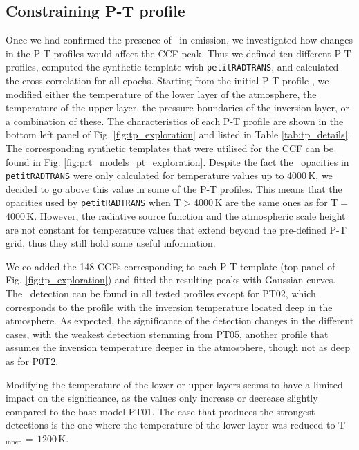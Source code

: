 \documentclass{aa}
\newcommand{\feI}{\ion{Fe}{i}}
\begin{document}
\subsection{Constraining P-T profile}
\label{sect:pt_exploration}


Once we had confirmed the presence of \feI\ in emission, we investigated how changes in the P-T profiles would affect the CCF peak. Thus we defined ten different P-T profiles, computed the synthetic template with \texttt{petitRADTRANS}, and calculated the cross-correlation for all epochs. Starting from the initial P-T profile \citep[PT01, see Fig. \ref{fig:prt_models} and Sect. \ref{synthetic_models},][]{wardenier2021, wardenier2023}, we modified either the temperature of the lower layer of the atmosphere, the temperature of the upper layer, the pressure boundaries of the inversion layer, or a combination of these. The characteristics of each P-T profile are shown in the bottom left panel of Fig. \ref{fig:tp_exploration} and listed in Table \ref{tab:tp_details}. The corresponding synthetic templates that were utilised for the CCF can be found in Fig. \ref{fig:prt_models_pt_exploration}. Despite the fact the \feI\ opacities in \texttt{petitRADTRANS} were only calculated for temperature values up to 4000\,K, we decided to go above this value in some of the P-T profiles. This means that the opacities used by \texttt{petitRADTRANS} when T$>$4000\,K are the same ones as for T$=$4000\,K. However, the radiative source function and the atmospheric scale height are not constant for temperature values that extend beyond the pre-defined P-T grid, thus they still hold some useful information.

We co-added the 148 CCFs corresponding to each P-T template (top panel of Fig. \ref{fig:tp_exploration}) and fitted the resulting peaks with Gaussian curves. The \feI\ detection can be found in all tested profiles except for PT02, which corresponds to the profile with the inversion temperature located deep in the atmosphere. As expected, the significance of the detection changes in the different cases, with the weakest detection stemming from PT05, another profile that assumes the inversion temperature deeper in the atmosphere, though not as deep as for P0T2.  

Modifying the temperature of the lower or upper layers seems to have a limited impact on the significance, as the values only increase or decrease slightly compared to the base model PT01. The case that produces the strongest detections is the one where the temperature of the lower layer was reduced to T$_\mathrm{inner}\,=\,1200$\,K.
\end{document}
